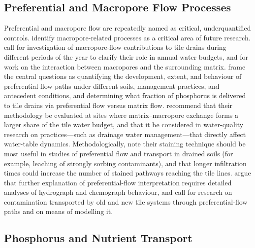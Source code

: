 \subsection{Preferential and Macropore Flow Processes}

Preferential and macropore flow are repeatedly named as critical, underquantified controls. \textcite{Boles2015} identify macropore-related processes as a critical area of future research. \textcite{Williams2016} call for investigation of macropore-flow contributions to tile drains during different periods of the year to clarify their role in annual water budgets, and for work on the interaction between macropores and the surrounding matrix. \textcite{King2015} frame the central questions as quantifying the development, extent, and behaviour of preferential-flow paths under different soils, management practices, and antecedent conditions, and determining what fraction of phosphorus is delivered to tile drains via preferential flow versus matrix flow. \textcite{Nazari2021} recommend that their methodology be evaluated at sites where matrix--macropore exchange forms a larger share of the tile water budget, and that it be considered in water-quality research on practices---such as drainage water management---that directly affect water-table dynamics. Methodologically, \textcite{Nielsen2015} note their staining technique should be most useful in studies of preferential flow and transport in drained soils (for example, leaching of strongly sorbing contaminants), and that longer infiltration times could increase the number of stained pathways reaching the tile lines. \textcite{Ruark2009} argue that further explanation of preferential-flow interpretation requires detailed analyses of hydrograph and chemograph behaviour, and \textcite{BACKLUND1995} call for research on contamination transported by old and new tile systems through preferential-flow paths and on means of modelling it.

\subsection{Phosphorus and Nutrient Transport}

